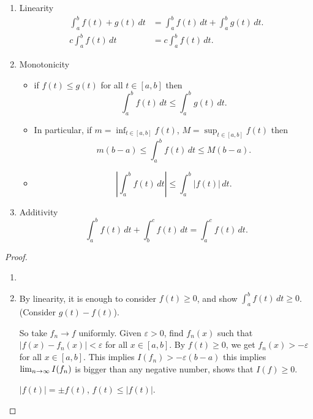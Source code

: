 \begin{theorem}\phantom{}\label{thm:prop_of_int}
    \begin{enumerate}[label = (\roman*)]
        \item Linearity
        \begin{align*}
            \int_{a}^{b}f(t) + g(t)\,dt &= \int_{a}^{b}f(t)\,dt + \int_{a}^{b}g(t)\,dt. \\
            c\int_{a}^{b}f(t)\,dt &= c\int_{a}^{b}f(t)\,dt.
        \end{align*}

        \item Monotonicity

        \begin{itemize}
            \item 
            if $f(t) \leq g(t)$ for all $t \in [a, b]$ then
            \[
            \int_{a}^{b}f(t)\,dt \leq \int_{a}^{b}g(t)\,dt.
            \]

            \item
            In particular,
            if $m = \inf_{t \in [a, b]}{f(t)}$,
            $M = \sup_{t \in [a, b]}{f(t)}$ then
            \[
            m(b - a) \leq \int_{a}^{b}f(t)\,dt \leq M(b - a).
            \]

            \item
            \[
            \left|\int_{a}^{b}f(t)\,dt\right| \leq \int_{a}^{b}|f(t)|\,dt.
            \]
        \end{itemize}
        \item Additivity
        \[
        \int_{a}^{b}f(t)\,dt + \int_{b}^{c}f(t)\,dt = \int_{a}^{c}f(t)\,dt.
        \]
    \end{enumerate}
\end{theorem}
\begin{proof}
    \begin{enumerate}[label = (\roman*)]
        \item \phantom{}
        
        \item
        By linearity,
        it is enough to consider $f(t) \geq 0$,
        and show $\int_{a}^{b}f(t)\,dt \geq 0$.
        (Consider $g(t) - f(t)$).

        So take $f_n \to f$ uniformly.
        Given $\varepsilon > 0$,
        find $f_n(x)$ such that $|f(x) - f_n(x)| < \varepsilon$ for all $x \in [a, b]$.
        By $f(t) \geq 0$,
        we get $f_n(x) > -\varepsilon$ for all $x \in [a, b]$.
        This implies $I(f_n) > -\varepsilon(b - a)$ this implies $\lim_{n \rightarrow \infty} I(f_n)$ is bigger than any negative number,
        shows that $I(f) \geq 0$.

        $|f(t)| = \pm f(t)$,
        $f(t) \leq |f(t)|$.
    \end{enumerate}
\end{proof}

